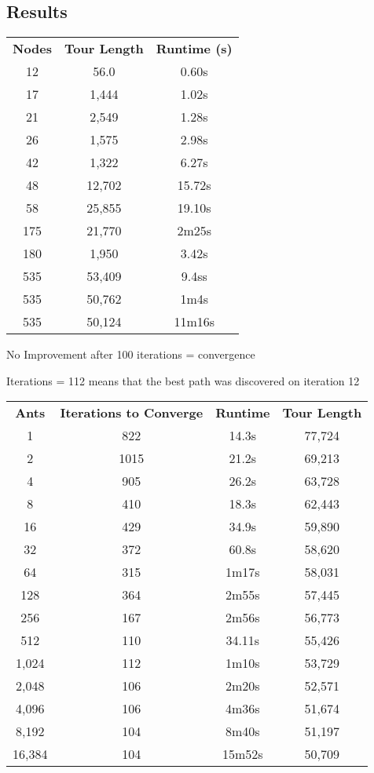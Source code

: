 \documentclass[a4paper, 11pt,table]{article}
\begin{document}
		\subsection{Results}
	\label{useCase:antResults}
	\begin{center}
		\begin{tabu}{|c c c|}
			\textbf{Nodes} & \textbf{Tour Length} & \textbf{Runtime (s)}\\
			12 & 56.0 & 0.60s \\
			17 & 1,444 & 1.02s\\
			21 & 2,549 & 1.28s\\
			26 & 1,575 & 2.98s\\
			42 & 1,322 & 6.27s\\
			48 & 12,702 & 15.72s\\
			58 & 25,855 & 19.10s\\
			175 &  21,770 & 2m25s\\
			180 & 1,950 & 3.42s\\
			535 & 53,409 & 9.4ss\\
			535 & 50,762 & 1m4s\\
			535 & 50,124 & 11m16s\\
		\end{tabu}
	\end{center}

	\begin{center}
		No Improvement after 100 iterations = convergence
		
		Iterations = 112 means that the best path was discovered on iteration 12
		
		\begin{tabu}{|c c c c|}
			\textbf{Ants} & \textbf{Iterations to Converge} & \textbf{Runtime} & \textbf{Tour Length}\\
			1 & 822 & 14.3s & 77,724\\
			2 & 1015 & 21.2s & 69,213\\
			4 & 905 & 26.2s & 63,728\\
			8 & 410 & 18.3s & 62,443\\
			16 & 429 & 34.9s & 59,890\\
			32 & 372 & 60.8s & 58,620 \\
			64 & 315 & 1m17s & 58,031 \\
			128 & 364 & 2m55s & 57,445 \\
			256 & 167 & 2m56s & 56,773 \\
			512 & 110 & 34.11s & 55,426 \\
			1,024 & 112 & 1m10s & 53,729 \\
			2,048 & 106 & 2m20s & 52,571 \\
			4,096 & 106 & 4m36s & 51,674 \\
			8,192 & 104 & 8m40s & 51,197 \\
			16,384 & 104 & 15m52s & 50,709 \\
		\end{tabu}
	\end{center}
\end{document}
